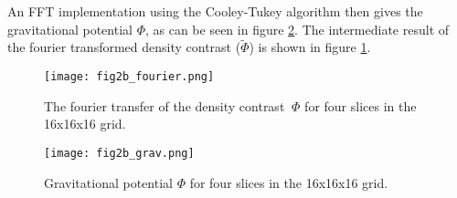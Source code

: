 An FFT implementation using the Cooley-Tukey algorithm then gives the gravitational potential $\Phi$, as can be seen in figure \ref{fig:gravitational_potential}.
The intermediate result of the fourier transformed density contrast ($\tilde{\Phi}$) is shown in figure \ref{fig:fourier_potential}.

\begin{figure}
    \centering
    \texttt{[image: fig2b\_fourier.png]}
    \caption{The fourier transfer of the density contrast $~\Phi$ for four slices in the 16x16x16 grid.}
    \label{fig:fourier_potential}
\end{figure}

\begin{figure}
    \centering
    \texttt{[image: fig2b\_grav.png]}
    \caption{Gravitational potential $\Phi$ for four slices in the 16x16x16 grid.}
    \label{fig:gravitational_potential}
\end{figure}






